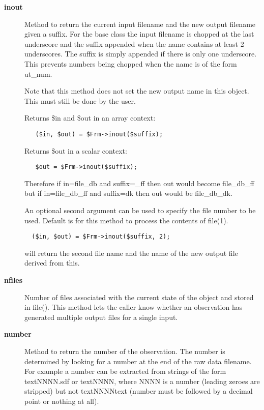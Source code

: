 \begin{description}
\item[\textbf{inout}] \mbox{}

Method to return the current input filename and the new output
filename given a suffix.  For the base class the input filename is
chopped at the last underscore and the suffix appended when the name
contains at least 2 underscores. The suffix is simply appended if
there is only one underscore. This prevents numbers being chopped when
the name is of the form ut\_num.



Note that this method does not set the new output name in this
object. This must still be done by the user.



Returns \$in and \$out in an array context:

\begin{verbatim}
   ($in, $out) = $Frm->inout($suffix);
\end{verbatim}


Returns \$out in a scalar context:

\begin{verbatim}
   $out = $Frm->inout($suffix);
\end{verbatim}


Therefore if in=file\_db and suffix=\_ff then out would
become file\_db\_ff but if in=file\_db\_ff and suffix=dk then
out would be file\_db\_dk.



An optional second argument can be used to specify the
file number to be used. Default is for this method to process
the contents of file(1).

\begin{verbatim}
  ($in, $out) = $Frm->inout($suffix, 2);
\end{verbatim}


will return the second file name and the name of the new output
file derived from this.

\item[\textbf{nfiles}] \mbox{}

Number of files associated with the current state of the object and
stored in file(). This method lets the caller know whether an
observation has generated multiple output files for a single input.

\item[\textbf{number}] \mbox{}

Method to return the number of the observation. The number is
determined by looking for a number at the end of the raw data
filename.  For example a number can be extracted from strings of the
form textNNNN.sdf or textNNNN, where NNNN is a number (leading zeroes
are stripped) but not textNNNNtext (number must be followed by a decimal
point or nothing at all).


\end{description}
